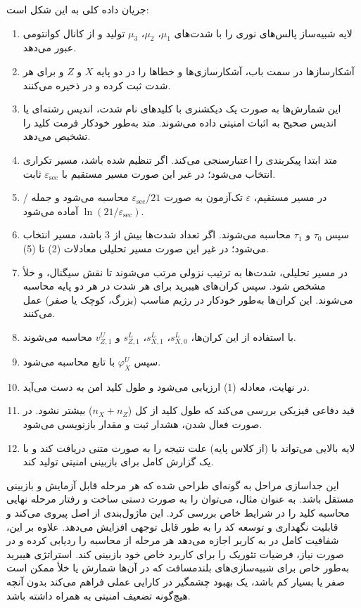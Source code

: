 جریان داده کلی به این شکل است:
\begin{enumerate}
	\item لایه شبیه‌ساز پالس‌های نوری را با شدت‌های $\mu_1$، $\mu_2$، $\mu_3$ تولید و از کانال کوانتومی عبور می‌دهد.
	\item آشکارسازها در سمت باب، آشکارسازی‌ها و خطاها را در دو پایه $X$ و $Z$ و برای هر شدت ثبت کرده و در  ذخیره می‌کنند.
	\item این شمارش‌ها به صورت یک دیکشنری  با کلیدهای نام شدت، اندیس رشته‌ای یا اندیس صحیح به اثبات امنیتی داده می‌شوند. متد  به‌طور خودکار فرمت کلید را تشخیص می‌دهد.
	\item متد  ابتدا پیکربندی را اعتبارسنجی می‌کند. اگر  تنظیم شده باشد، مسیر  تکراری انتخاب می‌شود؛ در غیر این صورت مسیر مستقیم با $\varepsilon_{\text{sec}}$ ثابت.
	\item در مسیر مستقیم، $\varepsilon$ تک‌آزمون به صورت $\varepsilon_{\text{sec}}/21$ محاسبه می‌شود و جمله / $\ln(21/\varepsilon_{\text{sec}})$ آماده می‌شود.
	\item سپس $\tau_0$ و $\tau_1$ محاسبه می‌شوند. اگر تعداد شدت‌ها بیش از 3 باشد، مسیر  انتخاب می‌شود؛ در غیر این صورت مسیر تحلیلی معادلات (2) تا (5).
	\item در مسیر تحلیلی، شدت‌ها به ترتیب نزولی مرتب می‌شوند تا نقش سیگنال،  و خلأ مشخص شود. سپس کران‌های هیبرید  برای هر شدت در هر دو پایه محاسبه می‌شوند. این کران‌ها به‌طور خودکار در رژیم مناسب (بزرگ، کوچک یا صفر) عمل می‌کنند.
	\item با استفاده از این کران‌ها، $s_{X,0}^L$، $s_{X,1}^L$، $s_{Z,1}^L$ و $v_{Z,1}^U$ محاسبه می‌شوند.
	\item سپس $\varphi_X^U$ با تابع  محاسبه می‌شود.
	\item در نهایت، معادله (1) ارزیابی می‌شود و طول کلید امن به دست می‌آید.
	\item قید دفاعی فیزیکی بررسی می‌کند که طول کلید از کل  ($n_X + n_Z$) بیشتر نشود. در صورت فعال شدن، هشدار ثبت و مقدار بازنویسی می‌شود.
	\item لایه بالایی می‌تواند با  (از کلاس پایه) علت نتیجه را به صورت متنی دریافت کند و با  یک گزارش کامل برای بازبینی امنیتی تولید کند.
\end{enumerate}

این جداسازی مراحل به گونه‌ای طراحی شده که هر مرحله قابل آزمایش و بازبینی مستقل باشد. به عنوان مثال، می‌توان  را به صورت دستی ساخت و رفتار مرحله نهایی محاسبه کلید را در شرایط خاص بررسی کرد. این ماژول‌بندی از اصل  پیروی می‌کند و قابلیت نگهداری و توسعه کد را به طور قابل توجهی افزایش می‌دهد. علاوه بر این، شفافیت کامل در  به کاربر اجازه می‌دهد هر مرحله از محاسبه را ردیابی کرده و در صورت نیاز، فرضیات تئوریک را برای کاربرد خاص خود بازبینی کند. استراتژی هیبرید  به‌طور خاص برای شبیه‌سازی‌های بلندمسافت که در آن‌ها شمارش  یا خلأ ممکن است صفر یا بسیار کم باشد، یک بهبود چشمگیر در کارایی عملی فراهم می‌کند بدون آنچه هیچ‌گونه تضعیف امنیتی به همراه داشته باشد.
